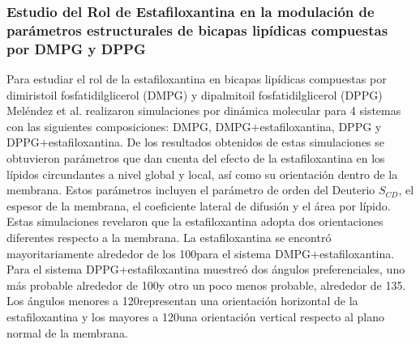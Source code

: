 \documentclass[12pt]{article}
\begin{document}
\subsubsection{Estudio del Rol de Estafiloxantina en la modulación de parámetros estructurales de bicapas lipídicas compuestas por DMPG y DPPG  \cite{MelendezDelgado2018StudyingBilayers}}
Para estudiar el rol de la estafiloxantina en bicapas lipídicas compuestas por dimiristoil fosfatidilglicerol (DMPG) y dipalmitoil fosfatidilglicerol (DPPG) Meléndez et al. \cite{MelendezDelgado2018StudyingBilayers} realizaron simulaciones por dinámica molecular para 4 sistemas con las siguientes composiciones: DMPG, DMPG$+$estafiloxantina, DPPG y DPPG$+$estafiloxantina. De los resultados obtenidos de estas simulaciones se obtuvieron parámetros que dan cuenta del efecto de la estafiloxantina en los lípidos circundantes a nivel global y local, así como su orientación dentro de la membrana. Estos parámetros incluyen el parámetro de orden del Deuterio $S_{CD}$, el espesor de la membrana, el coeficiente lateral de difusión y el área por lípido. \\

Estas simulaciones revelaron que la estafiloxantina adopta dos orientaciones diferentes respecto a la membrana. La estafiloxantina se encontró mayoritariamente alrededor de los 100\textdegree para el sistema   DMPG+estafiloxantina. Para el sistema  DPPG+estafiloxantina muestreó dos ángulos preferenciales,  uno más probable alrededor de 100\textdegree y otro un poco menos probable, alrededor de 135\textdegree. Los ángulos menores a 120\textdegree representan una orientación horizontal de la estafiloxantina y los mayores a 120\textdegree  una orientación vertical respecto al plano normal de la membrana.\\
\end{document}
